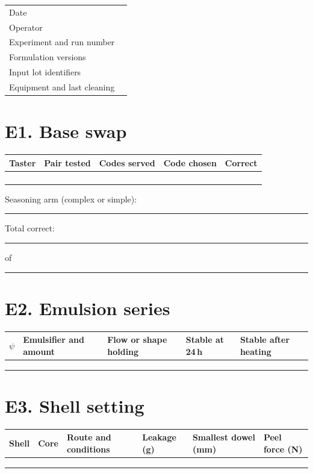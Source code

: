 \documentclass[11pt,openany]{book}
\theoremstyle{definition}
\begin{document}
\begin{center}
\begin{tabularx}{\linewidth}{@{}lX@{}}
\toprule
Date & \\
Operator & \\
Experiment and run number & \\
Formulation versions & \\
Input lot identifiers & \\
Equipment and last cleaning & \\
\bottomrule
\end{tabularx}
\end{center}

\section*{E1. Base swap}
\begin{center}
\small
\begin{tabularx}{\linewidth}{@{}lXXXl@{}}
\toprule
Taster & Pair tested & Codes served & Code chosen & Correct \\
\midrule
 & & & & \\ \midrule
 & & & & \\ \midrule
 & & & & \\ \midrule
 & & & & \\
\bottomrule
\end{tabularx}
\end{center}
Seasoning arm (complex or simple): \rule{4cm}{0.4pt}\qquad Total correct: \rule{2cm}{0.4pt} of \rule{1.5cm}{0.4pt}

\section*{E2. Emulsion series}
\begin{center}
\small
\begin{tabularx}{\linewidth}{@{}lXXXX@{}}
\toprule
$\psi$ & Emulsifier and amount & Flow or shape holding & Stable at 24\,h & Stable after heating \\
\midrule
 & & & & \\ \midrule
 & & & & \\ \midrule
 & & & & \\
\bottomrule
\end{tabularx}
\end{center}

\section*{E3. Shell setting}
\begin{center}
\small
\begin{tabularx}{\linewidth}{@{}llXXXX@{}}
\toprule
Shell & Core & Route and conditions & Leakage (g) & Smallest dowel (mm) & Peel force (N) \\
\midrule
 & & & & & \\ \midrule
 & & & & & \\ \midrule
 & & & & & \\
\bottomrule
\end{tabularx}
\end{center}
\end{document}
